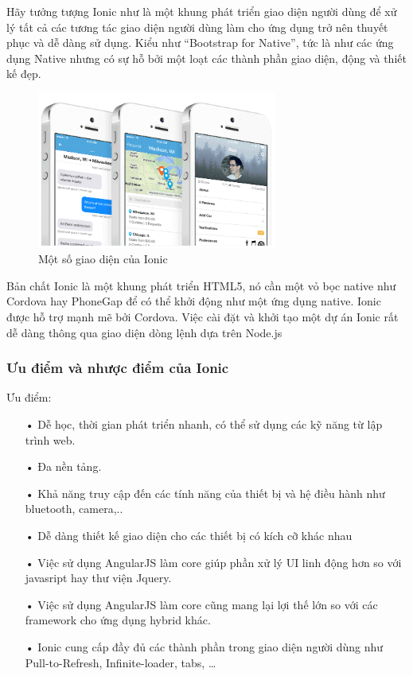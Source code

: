 Hãy tưởng tượng Ionic như là một khung phát triển giao diện người dùng để xử lý tất cả các tương tác giao diện người dùng làm cho ứng dụng trở nên thuyết phục và dễ dàng sử dụng. Kiểu như “Bootstrap for Native”, tức là như các ứng dụng Native nhưng có sự hỗ bởi một loạt các thành phần giao diện, động và thiết kế đẹp.

\begin{figure}[H]
	\centering    
	\includegraphics[width=0.7\textwidth]{ionic}
	\caption[Một số giao diện của Ionic ]{Một số giao diện của Ionic}
	\label{fig:ionic}
\end{figure}


Bản chất Ionic là một khung phát triển HTML5, nó cần một vỏ bọc native như Cordova hay PhoneGap để có thể khởi động như một ứng dụng native. Ionic được hỗ trợ mạnh mẽ bởi Cordova. Việc cài đặt và khởi tạo một dự án Ionic rất dễ dàng thông qua giao diện dòng lệnh dựa trên Node.js


\subsubsection*{Ưu điểm và nhược điểm của Ionic}

Ưu điểm:
\begin{itemize}
	\item[•] Dễ học, thời gian phát triển nhanh, có thể sử dụng các kỹ năng từ lập trình web.
	\item[•] Đa nền tảng.
	\item[•] Khả năng truy cập đến các tính năng của thiết bị và hệ điều hành như bluetooth, camera,..
	\item[•] Dễ dàng thiết kế giao diện cho các thiết bị có kích cỡ khác nhau
	\item[•] Việc sử dụng AngularJS làm core giúp phần xử lý UI linh động hơn so với javasript hay thư viện Jquery.
	\item[•] Việc sử dụng AngularJS làm core cũng mang lại lợi thế lớn so với các framework cho ứng dụng hybrid khác.
	\item[•] Ionic cung cấp đầy đủ các thành phần trong giao diện người dùng như Pull-to-Refresh, Infinite-loader, tabs, …
	
\end{itemize}


